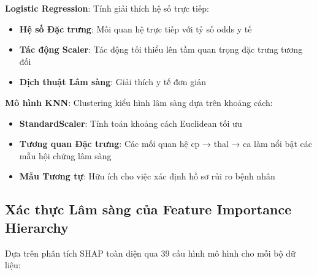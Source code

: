 \textbf{Logistic Regression}: Tính giải thích hệ số trực tiếp:
\begin{itemize}
    \item \textbf{Hệ số Đặc trưng}: Mối quan hệ trực tiếp với tỷ số odds y tế
    \item \textbf{Tác động Scaler}: Tác động tối thiểu lên tầm quan trọng đặc trưng tương đối
    \item \textbf{Dịch thuật Lâm sàng}: Giải thích y tế đơn giản
\end{itemize}

\textbf{Mô hình KNN}: Clustering kiểu hình lâm sàng dựa trên khoảng cách:
\begin{itemize}
    \item \textbf{StandardScaler}: Tính toán khoảng cách Euclidean tối ưu
    \item \textbf{Tương quan Đặc trưng}: Các mối quan hệ cp → thal → ca làm nổi bật các mẫu hội chứng lâm sàng
    \item \textbf{Mẫu Tương tự}: Hữu ích cho việc xác định hồ sơ rủi ro bệnh nhân
\end{itemize}

\subsection{Xác thực Lâm sàng của Feature Importance Hierarchy}

Dựa trên phân tích SHAP toàn diện qua 39 cấu hình mô hình cho mỗi bộ dữ liệu:

